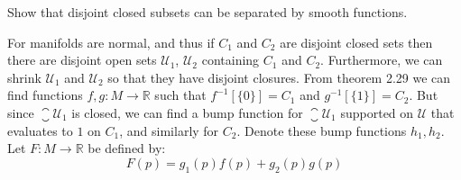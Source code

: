 \documentclass{article}                                                        %
\begin{document}
        \begin{problem}
            Show that disjoint closed subsets can be separated by smooth
            functions.
        \end{problem}
        \begin{solution}
            For manifolds are normal, and thus if $C_{1}$ and $C_{2}$ are
            disjoint closed sets then there are disjoint open sets
            $\mathcal{U}_{1}$, $\mathcal{U}_{2}$ containing $C_{1}$ and $C_{2}$.
            Furthermore, we can shrink $\mathcal{U}_{1}$ and $\mathcal{U}_{2}$
            so that they have disjoint closures. From theorem 2.29 we can find
            functions $f,g:M\rightarrow\mathbb{R}$ such that
            $f^{\minus{1}}[\{0\}]=C_{1}$ and $g^{\minus{1}}[\{1\}]=C_{2}$.
            But since $\closure{\mathcal{U}_{1}}$ is closed, we can find a bump
            function for $\closure{\mathcal{U}_{1}}$ supported on $\mathcal{U}$
            that evaluates to $1$ on $C_{1}$, and similarly for $C_{2}$.
            Denote these bump functions $h_{1},h_{2}$. Let
            $F:M\rightarrow\mathbb{R}$ be defined by:
            \begin{equation}
                F(p)=g_{1}(p)f(p)+g_{2}(p)g(p)
            \end{equation}
        \end{solution}
\end{document}
